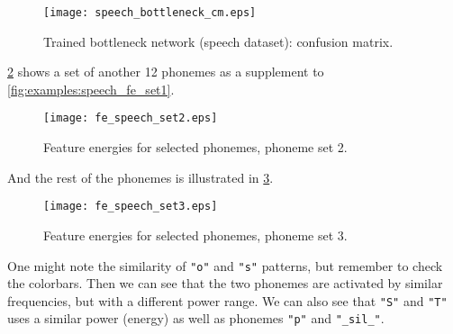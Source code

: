 \begin{figure}[H]
\centering
\texttt{[image: speech\_bottleneck\_cm.eps]}
\caption{Trained bottleneck network (speech dataset): confusion matrix.}
\label{fig:app:speech_bottleneck_cm}
\end{figure}

\cref{fig:app:speech_fe_set2} shows a set of another 12 phonemes as a supplement to \cref{fig:examples:speech_fe_set1}.
\begin{figure}[H]
\centering
\texttt{[image: fe\_speech\_set2.eps]}
\caption{Feature energies for selected phonemes, phoneme set 2.}
\label{fig:app:speech_fe_set2}
\end{figure}

And the rest of the phonemes is illustrated in \cref{fig:app:speech_fe_set3}.

\begin{figure}[H]
\centering
\texttt{[image: fe\_speech\_set3.eps]}
\caption{Feature energies for selected phonemes, phoneme set 3.}
\label{fig:app:speech_fe_set3}
\end{figure}

One might note the similarity of \texttt{"o"} and \texttt{"s"} patterns, but remember to check the colorbars. Then we can see that the two phonemes are activated by similar frequencies, but with a different power range. We can also see that \texttt{"S"} and \texttt{"T"} uses a similar power (energy) as well as phonemes \texttt{"p"} and \texttt{"\_sil\_"}.